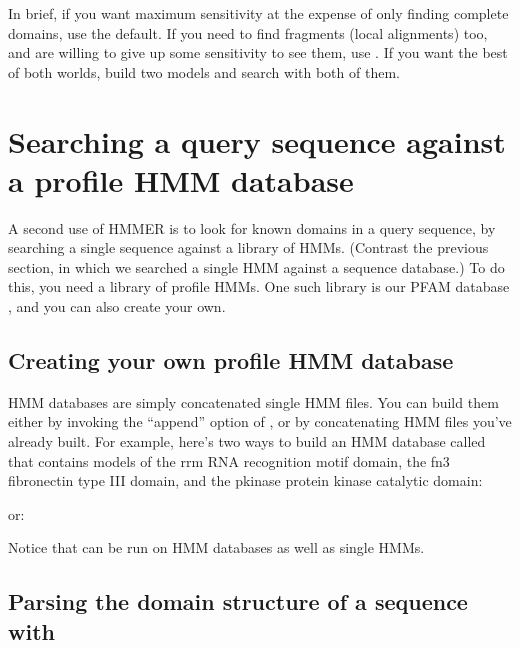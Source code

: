 In brief, if you want maximum sensitivity at the expense of only
finding complete domains, use the  default. If you need
to find fragments (local alignments) too, and are willing to give up
some sensitivity to see them, use . If you want the
best of both worlds, build two models and search with both of them.

\section{Searching a query sequence against a profile HMM database}

A second use of HMMER is to look for known domains in a query
sequence, by searching a single sequence against a library of
HMMs. (Contrast the previous section, in which we searched a single
HMM against a sequence database.) To do this, you need a library of
profile HMMs. One such library is our PFAM database
\cite{Sonnhammer97,Sonnhammer98}, and you can also create your own.

\subsection{Creating your own profile HMM database} 

HMM databases are simply concatenated single HMM files. You can build
them either by invoking the  ``append'' option of , or by concatenating HMM files you've already built.  For
example, here's two ways to build an HMM database called 
that contains models of the rrm RNA recognition motif domain, the fn3
fibronectin type III domain, and the pkinase protein kinase catalytic
domain:

\vspace{1.5em}

or:

\vspace{1.5em}

Notice that  can be run on HMM databases as well as
single HMMs.

\subsection{Parsing the domain structure of a sequence with }

